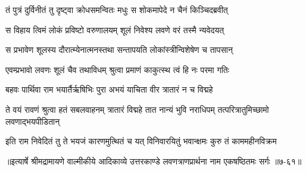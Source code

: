 \twolineshloka
{तं पुत्रं दुर्विनीतं तु दृष्ट्वा क्रोधसमन्वितः}
{मधुः स शोकमापेदे न चैनं किञ्चिदब्रवीत्} %

\twolineshloka
{स विहाय त्विमं लोकं प्रविष्टो वरुणालयम्}
{शूलं निवेश्य लवणे वरं तस्मै न्यवेदयत्} %

\twolineshloka
{स प्रभावेण शूलस्य दौरात्म्येनात्मनस्तथा}
{सन्तापयति लोकांस्त्रीन्विशेषेण च तापसान्} %

\twolineshloka
{एवम्प्रभावो लवणः शूलं चैव तथाविधम्}
{श्रुत्वा प्रमाणं काकुत्स्थ त्वं हि नः परमा गतिः} %

\twolineshloka
{बहवः पार्थिवा राम भयार्तैर्ऋषिभिः पुरा}
{अभयं याचिता वीर त्रातारं न च विद्महे} %

\threelineshloka
{ते वयं रावणं श्रुत्वा हतं सबलवाहनम्}
{त्रातारं विद्महे तात नान्यं भुवि नराधिपम्}
{तत्परित्रातुमिच्छामो लवणाद्भयपीडितान्} %

\twolineshloka
{इति राम निवेदितं तु ते भयजं कारणमुत्थितं च यत्}
{विनिवारयितुं भवान्क्षमः कुरु तं काममहीनविक्रम} %


॥इत्यार्षे श्रीमद्रामायणे वाल्मीकीये आदिकाव्ये उत्तरकाण्डे लवणत्राणप्रार्थना नाम एकषष्ठितमः सर्गः ॥७-६१॥
